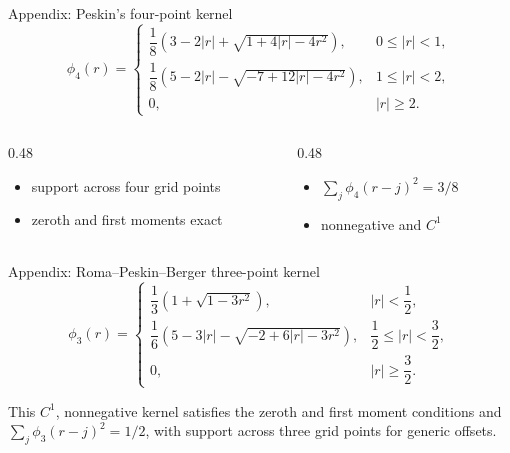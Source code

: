 \documentclass[aspectratio=169,11pt]{beamer}
\begin{document}
\begin{frame}{Appendix: Peskin's four-point kernel}
\small
\[
\phi_4(r)=
\begin{cases}
\dfrac18\left(3-2|r|+\sqrt{1+4|r|-4r^2}\right),
&0\le |r|<1,\\[6pt]
\dfrac18\left(5-2|r|-\sqrt{-7+12|r|-4r^2}\right),
&1\le |r|<2,\\[6pt]
0,&|r|\ge2.
\end{cases}
\]

\begin{columns}[T,onlytextwidth]
  \begin{column}{0.48\textwidth}
  \begin{itemize}
    \item support across four grid points
    \item zeroth and first moments exact
  \end{itemize}
  \end{column}
  \begin{column}{0.48\textwidth}
  \begin{itemize}
    \item \(\sum_j\phi_4(r-j)^2=3/8\)
    \item nonnegative and \(C^1\)
  \end{itemize}
  \end{column}
\end{columns}
\end{frame}

\begin{frame}{Appendix: Roma--Peskin--Berger three-point kernel}
\small
\[
\phi_3(r)=
\begin{cases}
\dfrac13\left(1+\sqrt{1-3r^2}\right),
&|r|<\dfrac12,\\[7pt]
\dfrac16\left(5-3|r|-\sqrt{-2+6|r|-3r^2}\right),
&\dfrac12\le |r|<\dfrac32,\\[7pt]
0,&|r|\ge\dfrac32.
\end{cases}
\]

\begin{punchbox}
This \(C^1\), nonnegative kernel satisfies the zeroth and first moment conditions and \(\sum_j\phi_3(r-j)^2=1/2\), with support across three grid points for generic offsets.
\end{punchbox}
\end{frame}
\end{document}
